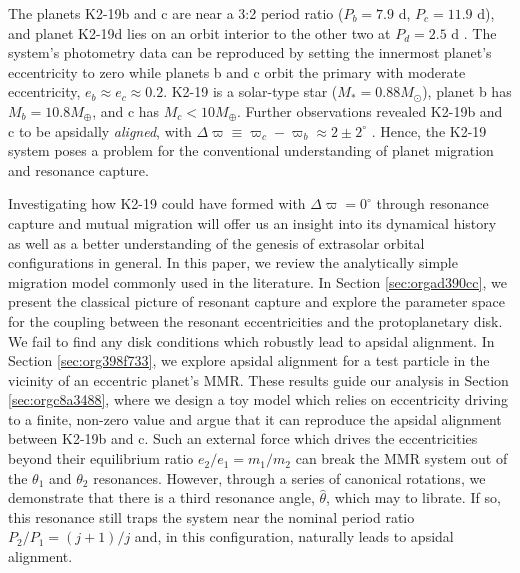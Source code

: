 \documentclass[usenatbib,onecolumn]{mnras}
\begin{document}
The planets K2-19b and c are near a 3:2 period ratio (\(P_b=7.9\) d,
\(P_c=11.9\) d), and planet K2-19d lies on an orbit interior to the
other two at \(P_d=2.5\) d
\citep{howell14_k2_mission,armstrong15_one_closes_exopl_pairs_to,sinukoff16_eleven_multip_system_fromk_masses}.
The system's photometry data can be reproduced by setting the
innermost planet's eccentricity to zero while planets b and c orbit
the primary with moderate eccentricity, \(e_b\approx e_c \approx 0.2\).
K2-19 is a solar-type star
(\(M_*=0.88M_\odot\)), planet b has \(M_{b}=10.8 M_{\oplus}\), and c has
\(M_{c}<10M_{\oplus}\).  Further observations revealed K2-19b and
c to be apsidally \emph{aligned}, with \(\Delta\varpi\equiv
\varpi_c-\varpi_b \approx 2\pm 2^\circ\) \citep{petigura_k2-19b_2020}.
Hence, the K2-19 system poses a problem for the conventional
understanding of planet migration and resonance capture.

Investigating how K2-19 could have formed with \(\Delta\varpi=0^\circ\)
through resonance capture and mutual migration will offer us an
insight into its dynamical history as well as a better understanding
of the genesis of extrasolar orbital configurations in general.  In
this paper, we review the analytically simple migration model commonly
used in the literature.  In Section \ref{sec:orgad390cc}, we present the classical picture of resonant capture and
explore the parameter space for the coupling between the resonant
eccentricities and the protoplanetary disk. We fail to find any disk
conditions which robustly lead to apsidal alignment.  In Section \ref{sec:org398f733}, we explore apsidal alignment for a test particle in
the vicinity of an eccentric planet's MMR. These results guide our
analysis in Section \ref{sec:orgc8a3488}, where we design a toy model which
relies on eccentricity driving to a finite, non-zero value and argue
that it can reproduce the apsidal alignment between K2-19b and c.
Such an external force which drives the eccentricities beyond their
equilibrium ratio \(e_2/e_1 = m_1/m_2\) can
break the MMR system out of the \(\theta_1\) and \(\theta_2\) resonances.
However, through a series of canonical rotations, we demonstrate that
there is a third resonance angle, \(\hat\theta\), which may to
librate.  If so, this resonance still traps the system near the nominal
period ratio \(P_2/P_1=(j+1)/j\) and, in this configuration, naturally
leads to apsidal alignment.
\end{document}

